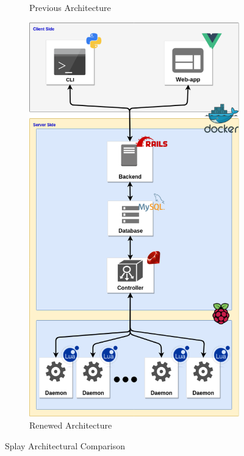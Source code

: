 \documentclass{eplmastersthesis}
\begin{document}
\begin{figure}[!tbp]
\begin{subfigure}{0.45\textwidth}
          \caption{Previous Architecture}
        \end{subfigure}
        \hfill
        \begin{subfigure}{0.45\textwidth}
          \includegraphics[width=\textwidth]{figures/new_arch.png}
          \caption{Renewed Architecture}
        \end{subfigure}
        \caption{Splay Architectural Comparison}
        \label{fig:test}
      \end{figure}
\end{document}
